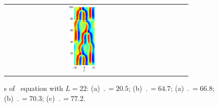 \begin{figure}[t]
\begin{center}
\begin{tabular}{ccccc}
\includegraphics[width=0.18\textwidth]{figs/ks22rpo077.2-00.00.eps}
\end{tabular}
\end{center}
\caption{\Po s of \KS\ equation with $L = 22$:
(a) $\period{} = 20.5$;
(b) $\period{} = 64.7$;
(a) $\period{} = 66.8$;
(b) $\period{} = 70.3$;
(c) $\period{} = 77.2$.} \label{f:ks22rposPO}
\end{figure}
